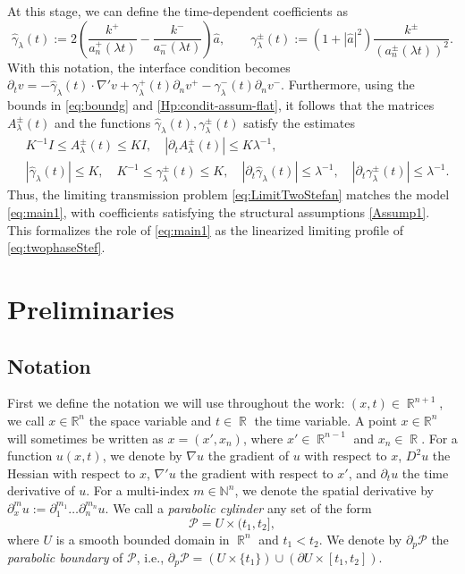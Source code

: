 \documentclass[12pt]{article}
\numberwithin{Theorem}{section}
\theoremstyle{definition}
\theoremstyle{remark}
\numberwithin{equation}{section}
\DeclareMathOperator{\R}{\mathbb{R}}
\newcommand{\p}{\partial}
\begin{document}
At this stage, we can define the time-dependent coefficients as 
\[
\hat \gamma_\lambda(t) := 2 \left( \frac{k^+}{a_n^+(\lambda t)}- \frac{k^-}{a_n^-(\lambda t)}\right)\hat a, \qquad \gamma_\lambda^{\pm}(t):=\left(1+|\hat a|^2 \right) \frac{k^\pm}{(a_n^\pm(\lambda t))^2}.
\]
With this notation, the interface condition becomes $\partial_t v = -\hat{\gamma}_\lambda(t) \cdot \nabla' v + \gamma_\lambda^+(t) \partial_n v^+ - \gamma_\lambda^-(t) \partial_n v^-$.
Furthermore, using the bounds in \eqref{eq:boundg} and \eqref{Hp:condit-assum-flat}, it follows that the matrices $A^{\pm}_\lambda(t)$ and the functions $\hat{\gamma}_\lambda(t), \gamma_\lambda^{\pm}(t)$ satisfy the estimates
\begin{align*}
    &K^{-1}I \leq A_\lambda^{\pm}(t) \leq K I,  \quad
    |{\p_t} A_\lambda^{\pm}(t)| \leq K \lambda^{-1}, \\
    &|\hat{\gamma}_\lambda(t)| \leq K, \quad K^{-1} \leq \gamma_\lambda^{\pm}(t) \leq K, \quad
    |{\p_t} \hat{\gamma}_\lambda(t)| \leq \lambda^{-1}, \quad |{\p_t} \gamma_\lambda^\pm(t)| \leq \lambda^{-1}.
\end{align*}
 Thus, the limiting transmission problem \eqref{eq:LimitTwoStefan} matches the model \eqref{eq:main1}, with coefficients satisfying the structural assumptions \eqref{Assump1}. This formalizes the role of \eqref{eq:main1} as the linearized limiting profile of \eqref{eq:twophaseStef}.



  

\section{Preliminaries}\label{sec:preli}
\subsection{Notation}

First we define the notation we will use throughout the work: $(x,t)\in \R^{n+1}$, we call $x\in \mathbb{R}^n$ the space variable and $t \in \R$  the time variable. A point $x\in \mathbb{R}^n$ will sometimes be written as $x=(x',x_n)$, where $x'\in \R^{n-1}$ and $x_n \in \R$.
For a function $u(x,t)$, we denote by $\nabla u$ the gradient of $u$ with respect to $x$, $D^2 u$ the Hessian with respect to $x$, $\nabla' u$ the gradient with respect to $x'$, and $\p_t u$ the time derivative of $u$.  For a multi-index $m \in \mathbb{N}^n$, we denote the spatial derivative by $\partial_x^m u := \partial_{1}^{m_1} \dots \partial_{n}^{m_n} u$.
We call a \textit{parabolic cylinder} any set of the form 
 $$\mathcal{P}=U \times (t_1,t_2],$$
 where $U$ is a smooth bounded domain in $\R^n$ and $t_1 < t_2$. We denote by $\partial_p \mathcal{P}$ the \textit{parabolic boundary} of $\mathcal{P}$, i.e., $\partial_p {\mathcal{P}}=\left( U\times \{t_1\}  \right)  \cup   \left( \partial U \times [t_1,t_2] \right) $.
 
\end{document}
